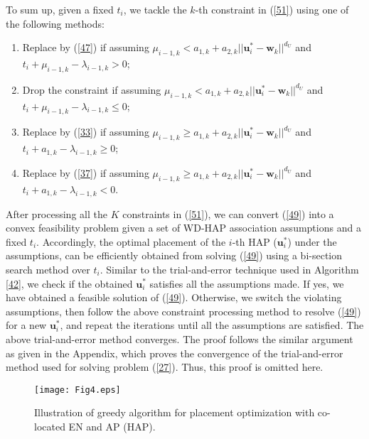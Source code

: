 \documentclass[journal, draftcls, one column, 12pt]{IEEEtran}
\begin{document}
To sum up, given a fixed $t_i$, we tackle the $k$-th constraint in (\ref{51}) using one of the following methods:
\begin{enumerate}
  \item Replace by (\ref{47}) if assuming $\mu_{i-1,k}< a_{1,k} + a_{2,k} ||\mathbf{u}_{i}^* - \mathbf{w}_k||^{d_U}$ and $t_i+ \mu_{i-1,k} - \lambda_{i-1,k} > 0$;
  \item Drop the constraint if assuming $\mu_{i-1,k}< a_{1,k} + a_{2,k} ||\mathbf{u}_{i}^* - \mathbf{w}_k||^{d_U}$ and $t_i+ \mu_{i-1,k} - \lambda_{i-1,k} \leq 0$;
  \item Replace by (\ref{33}) if assuming $\mu_{i-1,k}\geq a_{1,k} + a_{2,k} ||\mathbf{u}_{i}^* - \mathbf{w}_k||^{d_U}$ and $t_i+ a_{1,k}- \lambda_{i-1,k} \geq 0$;
  \item Replace by (\ref{37}) if assuming $\mu_{i-1,k}\geq a_{1,k} + a_{2,k} ||\mathbf{u}_{i}^* - \mathbf{w}_k||^{d_U}$ and $t_i + a_{1,k}- \lambda_{i-1,k}< 0$.
\end{enumerate}
After processing all the $K$ constraints in (\ref{51}), we can convert (\ref{49}) into a convex feasibility problem given a set of WD-HAP association assumptions and a fixed $t_i$. Accordingly, the optimal placement of the $i$-th HAP ($\mathbf{u}_i^*$) under the assumptions, can be efficiently obtained from solving (\ref{49}) using a bi-section search method over $t_i$. Similar to the trial-and-error technique used in Algorithm \ref{42}, we check if the obtained $\mathbf{u}_i^*$ satisfies all the assumptions made. If yes, we have obtained a feasible solution of (\ref{49}). Otherwise, we switch the violating assumptions, then follow the above constraint processing method to resolve (\ref{49}) for a new $\mathbf{u}_i^*$, and repeat the iterations until all the assumptions are satisfied. The above trial-and-error method converges. The proof follows the similar argument as given in the Appendix, which proves the convergence of the trial-and-error method used for solving problem (\ref{27}). Thus, this proof is omitted here.


\begin{figure}
\centering
  \begin{center}
    \texttt{[image: Fig4.eps]}
  \end{center}
  \caption{Illustration of greedy algorithm for placement optimization with co-located EN and AP (HAP).}
  \label{66}
\end{figure}
\end{document}
